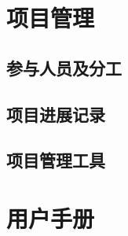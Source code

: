\documentclass[UTF8,a4paper,10pt]{ctexart}
\begin{document}
\section{项目管理}

\subsection{参与人员及分工}

\subsection{项目进展记录}

\subsection{项目管理工具}

\section{用户手册}
\end{document}
